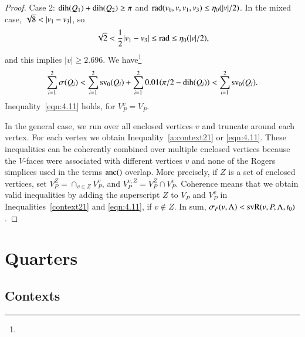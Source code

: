 \begin{proof}
\noindent Case 2:  $\operatorname{dih}(Q_1)+\operatorname{dih}(Q_2)\ge\pi$ and
    $\operatorname{rad}(v_0,v,v_1,v_3)\le \eta_0(|v|/2)$.
 In the mixed case,
$\sqr8<|v_1-v_3|$, so
$$\sqrt2<{\frac{1}{2}}|v_1-v_3|\le\operatorname{rad} \le \eta_0(|v|/2),$$
and this implies $|v|\ge 2.696$. We
have\footnote{}
$$\sum_{i=1}^2 \sigma(Q_i) < \sum_{i=1}^2 {\operatorname{sv}}_0(Q_i) +
\sum_{i=1}^2 0.01(\pi/2-\operatorname{dih}(Q_i))< \sum_{i=1}^2 {\operatorname{sv}}_0(Q_i).$$
Inequality~\ref{eqn:4.11} holds, for $V_P^v=V_P$.

In the general case, we run over all enclosed vertices $v$ and
truncate around each vertex.  For each vertex we obtain
Inequality~\ref{a:context21} or \ref{eqn:4.11}. These inequalities can
be coherently combined over multiple enclosed vertices because the
$V$-faces were associated with different vertices $v$ and none of
the Rogers simplices used in the terms $\operatorname{anc}()$ overlap. More
precisely, if $Z$ is a set of enclosed vertices, set $V_P^Z =
\cap_{v\in Z} V_P^v$, and $V_P^{v,Z} = V_P^Z\cap V_P^v$. Coherence
means that we obtain valid inequalities by adding the superscript
$Z$ to $V_P$ and $V_P^v$ in Inequalities~\ref{context21} and
\ref{eqn:4.11}, if $v\not\in Z$. In sum,
    $\sigma_P(v,\Lambda) < {\operatorname{svR}}(v,P,\Lambda,t_0)$.
%
\end{proof}



\section{Quarters} %
    \label{sec:upright}







\subsection{Contexts} %

